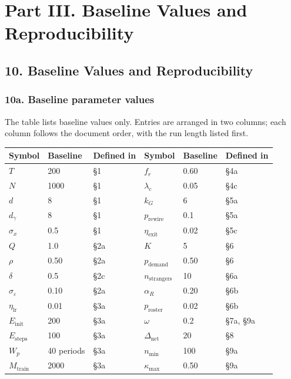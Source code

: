 \documentclass[11pt]{article}
\begin{document}
\section{Part III. Baseline Values and Reproducibility}\label{part-iii.-baseline-values-and-reproducibility}

\subsection{10. Baseline Values and Reproducibility}\label{baseline-values-and-reproducibility}

\subsubsection{10a. Baseline parameter values}\label{a.-baseline-parameter-values}

The table lists baseline values only. Entries are arranged in two columns; each column follows the document order, with the run length listed first.

{
\begin{center}
\small
\setlength{\tabcolsep}{3pt}
\begin{tabular}{@{}lll@{\hspace{1.6em}}lll@{}}
\toprule
Symbol & Baseline & Defined in & Symbol & Baseline & Defined in \\
\midrule
\(T\) & 200 & §1 & \(f_r\) & 0.60 & §4a \\
\(N\) & 1000 & §1 & \(\lambda_c\) & 0.05 & §4c \\
\(d\) & 8 & §1 & \(k_G\) & 6 & §5a \\
\(d_\gamma\) & 8 & §1 & \(p_{\text{rewire}}\) & 0.1 & §5a \\
\(\sigma_x\) & 0.5 & §1 & \(\eta_{\mathrm{exit}}\) & 0.02 & §5c \\
\(Q\) & 1.0 & §2a & \(K\) & 5 & §6 \\
\(\rho\) & 0.50 & §2a & \(p_{\text{demand}}\) & 0.50 & §6 \\
\(\delta\) & 0.5 & §2c & \(n_{\mathrm{strangers}}\) & 10 & §6a \\
\(\sigma_\varepsilon\) & 0.10 & §2a & \(\alpha_R\) & 0.20 & §6b \\
\(\eta_{\mathrm{lr}}\) & 0.01 & §3a & \(p_{\text{roster}}\) & 0.02 & §6b \\
\(E_{\text{init}}\) & 200 & §3a & \(\omega\) & 0.2 & §7a, §9a \\
\(E_{\text{steps}}\) & 100 & §3a & \(\Delta_{\mathrm{net}}\) & 20 & §8 \\
\(W_p\) & 40 periods & §3a & \(n_{\min}\) & 100 & §9a \\
\(M_{\text{train}}\) & 2000 & §3a & \(\kappa_{\max}\) & 0.50 & §9a \\
\bottomrule
\end{tabular}
\end{center}
}
\end{document}
